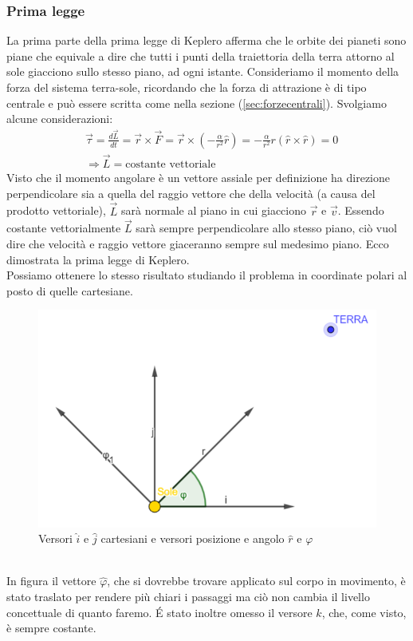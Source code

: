 \documentclass[10pt,a4paper]{article}
\begin{document}
\subsubsection{Prima legge}
La prima parte della prima legge di Keplero afferma che le orbite dei pianeti sono piane che equivale a dire che tutti i punti della traiettoria della terra attorno al sole giacciono sullo stesso piano, ad ogni istante. Consideriamo il momento della forza del sistema terra-sole, ricordando che la forza di attrazione è di tipo centrale e può essere scritta come nella sezione (\ref{sec:forzecentrali}). Svolgiamo alcune considerazioni:
\begin{align*}
&\vec{\tau} = \frac{d\vec{L}}{dt} = \vec{r}\times \vec{F} = \vec{r}\times (-\frac{\alpha}{r^2}\hat{r}) = -\frac{\alpha}{r^2}r( \hat{r}\times \hat{r}) = 0\\
&\Rightarrow \vec{L} = \text{costante vettoriale}
\end{align*}
Visto che il momento angolare è un vettore assiale per definizione ha direzione perpendicolare sia a quella del raggio vettore che della velocità (a causa del prodotto vettoriale), $\vec{L}$ sarà normale al piano in cui giacciono $\vec{r}$ e $\vec{v}$. Essendo costante vettorialmente $\vec{L}$ sarà sempre perpendicolare allo stesso piano, ciò vuol dire che velocità e raggio vettore giaceranno sempre sul medesimo piano. Ecco dimostrata la prima legge di Keplero.\\
Possiamo ottenere lo stesso risultato studiando il problema in coordinate polari al posto di quelle cartesiane. \\
\begin{figure}[h!]
	\centering
	\includegraphics[width=0.4\linewidth]{polarcoordinates}
	\caption{Versori $\hat{i}$ e $\hat{j}$ cartesiani e versori posizione e angolo $\hat{r}$ e $\varphi$}
	\label{fig:polarcoordinates}
\end{figure}\\
In figura il vettore $\hat{\varphi}$, che si dovrebbe trovare applicato sul corpo in movimento, è stato traslato per rendere più chiari i passaggi ma ciò non cambia il livello concettuale di quanto faremo. \'{E} stato inoltre omesso il versore $\hat{k}$, che, come visto, è sempre costante.\\
\end{document}
